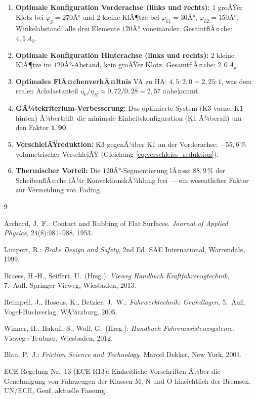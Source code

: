 ﻿\documentclass[12pt,a4paper]{article}
\theoremstyle{definition}
\begin{document}
\begin{enumerate}[leftmargin=2em, itemsep=4pt]
  \item \textbf{Optimale Konfiguration Vorderachse (links und rechts):}
        1 groÃŸer Klotz bei $\varphi_g = 270Â°$ und 2 kleine KlÃ¶tze bei
        $\varphi_{k1} = 30Â°$, $\varphi_{k2} = 150Â°$.
        Winkelabstand: alle drei Elemente $120Â°$ voneinander.
        GesamtflÃ¤che: $4{,}5\,A_k$.

  \item \textbf{Optimale Konfiguration Hinterachse (links und rechts):}
        2 kleine KlÃ¶tze im $120Â°$-Abstand, kein groÃŸer Klotz.
        GesamtflÃ¤che: $2{,}0\,A_k$.

  \item \textbf{Optimales FlÃ¤chenverhÃ¤ltnis} VA zu HA:
        $4{,}5 : 2{,}0 = 2{,}25 : 1$, was dem realen Achslastanteil
        $\eta_V / \eta_H \approx 0{,}72 / 0{,}28 = 2{,}57$ nahekommt.

  \item \textbf{GÃ¼tekriterium-Verbesserung:}  Das optimierte System
        (K3 vorne, K1 hinten) Ã¼bertrifft die minimale Einheitskonfiguration
        (K1 Ã¼berall) um den Faktor $\mathbf{1{,}90}$.

  \item \textbf{VerschleiÃŸreduktion:} K3 gegenÃ¼ber K1 an der Vorderachse:
        $-55{,}6\,\%$ volumetrischer VerschleiÃŸ (Gleichung \eqref{eq:verschleiss_reduktion}).

  \item \textbf{Thermischer Vorteil:} Die $120Â°$-Segmentierung lÃ¤sst
        $88{,}9\,\%$ der ScheibenflÃ¤che fÃ¼r KonvektionskÃ¼hlung frei ---
        ein wesentlicher Faktor zur Vermeidung von Fading.
\end{enumerate}

\newpage
\begin{thebibliography}{9}

Archard, J.\ F.:
Contact and Rubbing of Flat Surfaces.
\textit{Journal of Applied Physics}, 24(8):981--988, 1953.

Limpert, R.:
\textit{Brake Design and Safety}, 2nd Ed.
SAE International, Warrendale, 1999.

Braess, H.-H., Seiffert, U.\ (Hrsg.):
\textit{Vieweg Handbuch Kraftfahrzeugtechnik}, 7.\ Aufl.
Springer Vieweg, Wiesbaden, 2013.

Reimpell, J., Hoseus, K., Betzler, J.\ W.:
\textit{Fahrwerktechnik: Grundlagen}, 5.\ Aufl.
Vogel-Buchverlag, WÃ¼rzburg, 2005.

Winner, H., Hakuli, S., Wolf, G.\ (Hrsg.):
\textit{Handbuch Fahrerassistenzsysteme}.
Vieweg+Teubner, Wiesbaden, 2012.

Blau, P.\ J.:
\textit{Friction Science and Technology}.
Marcel Dekker, New York, 2001.

ECE-Regelung Nr.\ 13 (ECE-R13):
Einheitliche Vorschriften Ã¼ber die Genehmigung von Fahrzeugen der Klassen M, N und O
hinsichtlich der Bremsen.
UN/ECE, Genf, aktuelle Fassung.

\end{thebibliography}
\end{document}
